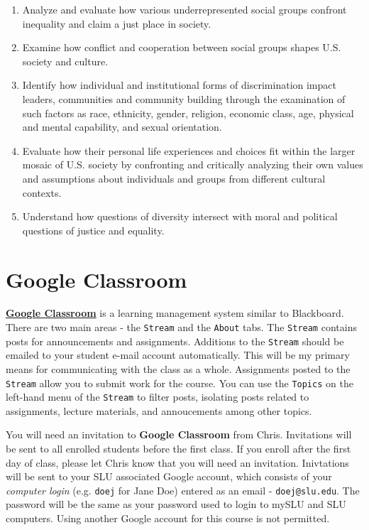 \documentclass[]{book}
\theoremstyle{definition}
\theoremstyle{definition}
\theoremstyle{definition}
\theoremstyle{remark}
\begin{document}
\begin{enumerate}
\def\labelenumi{\arabic{enumi}.}
\item
  Analyze and evaluate how various underrepresented social groups
  confront inequality and claim a just place in society.
\item
  Examine how conflict and cooperation between social groups shapes U.S.
  society and culture.
\item
  Identify how individual and institutional forms of discrimination
  impact leaders, communities and community building through the
  examination of such factors as race, ethnicity, gender, religion,
  economic class, age, physical and mental capability, and sexual
  orientation.
\item
  Evaluate how their personal life experiences and choices fit within
  the larger mosaic of U.S. society by confronting and critically
  analyzing their own values and assumptions about individuals and
  groups from different cultural contexts.
\item
  Understand how questions of diversity intersect with moral and
  political questions of justice and equality.
\end{enumerate}

\hypertarget{google-classroom}{%
\section{Google Classroom}\label{google-classroom}}

\textbf{\href{https://classroom.google.com}{Google Classroom}} is a
learning management system similar to Blackboard. There are two main
areas - the \texttt{Stream} and the \texttt{About} tabs. The
\texttt{Stream} contains posts for announcements and assignments.
Additions to the \texttt{Stream} should be emailed to your student
e-mail account automatically. This will be my primary means for
communicating with the class as a whole. Assignments posted to the
\texttt{Stream} allow you to submit work for the course. You can use the
\texttt{Topics} on the left-hand menu of the \texttt{Stream} to filter
posts, isolating posts related to assignments, lecture materials, and
annoucements among other topics.

You will need an invitation to \textbf{Google Classroom} from Chris.
Invitations will be sent to all enrolled students before the first
class. If you enroll after the first day of class, please let Chris know
that you will need an invitation. Inivtations will be sent to your SLU
associated Google account, which consists of your \emph{computer login}
(e.g. \texttt{doej} for Jane Doe) entered as an email -
\texttt{doej@slu.edu}. The password will be the same as your password
used to login to mySLU and SLU computers. Using another Google account
for this course is not permitted.
\end{document}
